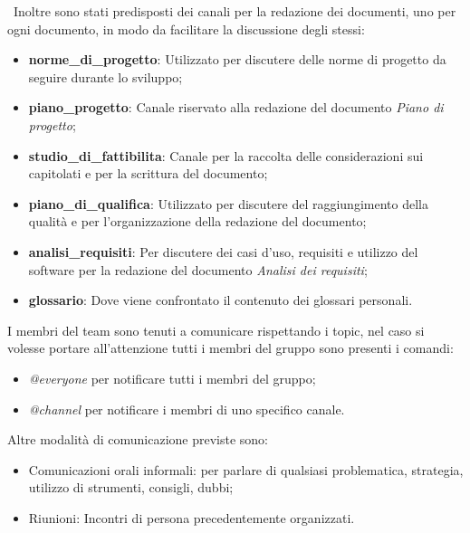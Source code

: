                 ~\newline Inoltre sono stati predisposti dei canali per la redazione dei documenti, uno per ogni documento, in modo da facilitare la discussione degli stessi:
                \begin{itemize}
                    \item \textbf{norme\_di\_progetto}: Utilizzato per discutere delle norme di progetto da seguire durante lo sviluppo;
                    \item \textbf{piano\_progetto}: Canale riservato alla redazione del documento \textit{Piano di progetto};
                    \item \textbf{studio\_di\_fattibilita}: Canale per la raccolta delle considerazioni sui capitolati e per la scrittura del documento;
                    \item \textbf{piano\_di\_qualifica}: Utilizzato per discutere del raggiungimento della qualità e per l'organizzazione della redazione del documento;
                    \item \textbf{analisi\_requisiti}: Per discutere dei casi d'uso, requisiti e utilizzo del software per la redazione del documento \textit{Analisi dei requisiti}; 
                    \item \textbf{glossario}: Dove viene confrontato il contenuto dei glossari personali.
                \end{itemize}
                
                I membri del team sono tenuti a comunicare rispettando i topic, nel caso si volesse portare all'attenzione tutti i membri del gruppo sono presenti i comandi:
                \begin{itemize}
                    \item \textit{@everyone} per notificare tutti i membri del gruppo;
                    \item \textit{@channel} per notificare i membri di uno specifico canale.
                \end{itemize}
                
              
                Altre modalità di comunicazione previste sono:
                \begin{itemize}
                    \item Comunicazioni orali informali: per parlare di qualsiasi problematica, strategia, utilizzo di strumenti, consigli, dubbi;
                    \item Riunioni: Incontri di persona precedentemente organizzati.
                \end{itemize}        
